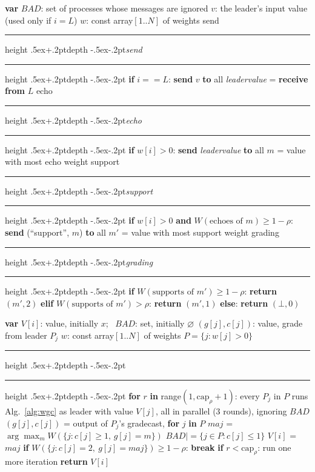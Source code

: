 \documentclass[conference]{IEEEtran}
\theoremstyle{definition}
\newcommand{\W}{W}
\newcommand{\capr}{\mathrm{cap}_\rho}
\newcommand{\BAD}{\mathit{BAD}}
\newcommand{\maj}{\mathit{maj}}
\newcommand{\kw}[1]{\textbf{#1}}
\newcommand{\varind}{\hphantom{\kw{var}}}
\newcommand{\midrulefill}{\leavevmode\leaders\hrule height \dimexpr.5ex+.2pt\relax depth -\dimexpr.5ex-.2pt\relax\hfill\kern0pt}
\newcommand{\sep}[1]{\ifx\relax#1\relax\hrulefill\else\midrulefill\enspace\textit{#1}\enspace\midrulefill\fi}
\newcommand{\ind}{\hspace*{\algorithmicindent}}
\begin{document}
\begin{algorithm}[t]
\caption{Weighted Gradecast at $P_i$, leader $L$, for $\rho<1/3$}\label{alg:wgc}
\begin{algorithmic}[1]
\Statex \kw{var} $\BAD$: set of processes whose messages are ignored
\Statex \varind $v$: the leader's input value (used only if $i=L$)
\Statex \varind $w$: const array$[1..N]$ of weights
\Statex \sep{send}
\State \kw{if} $i==L$: \kw{send} $v$ \kw{to} all
\State \textit{leadervalue} = \kw{receive from} $L$
\Statex \sep{echo}
\State \kw{if} $w[i]>0$: \kw{send} \textit{leadervalue} \kw{to} all
\State $m$ = value with most echo weight
\Statex \sep{support}
\State \kw{if} $w[i]>0$ \kw{and} $\W(\text{echoes of }m)\ge 1-\rho$:
\Statex \ind\ind \kw{send} (``support'', $m$) \kw{to} all
\State $m'$ = value with most support weight
\Statex \sep{grading}
\State \kw{if} $\W(\text{supports of }m')\ge 1-\rho$: \kw{return} $(m',2)$
\State \kw{elif} $\W(\text{supports of }m')>\rho$: \kw{return} $(m',1)$
\State \kw{else}: \kw{return} $(\bot,0)$
\end{algorithmic}
\end{algorithm}

\begin{algorithm}[t]
\caption{Weighted Gradecast consensus at $P_i$, for $\rho<1/3$}\label{alg:cons}
\begin{algorithmic}[1]
\Statex \kw{var} $V[i]$: value, initially $x$; \ $\BAD$: set, initially $\varnothing$
\Statex \varind $(g[j],c[j])$: value, grade from leader $P_j$
\Statex \varind $w$: const array$[1..N]$ of weights
\Statex \varind $P=\{j : w[j]>0\}$\vspace{-0.5\baselineskip}
\Statex \sep{}
\State \kw{for} $r$ \kw{in} range$(1,\capr+1)$:
\State \ind every $P_j$ in $P$ runs Alg.~\ref{alg:wgc} as leader with value
\Statex \ind\ind $V[j]$, all in parallel (3 rounds), ignoring $\BAD$
\State \ind $(g[j],c[j])$ = output of $P_j$'s gradecast, \kw{for} $j$ \kw{in} $P$
\State \ind $\maj$ = $\arg\max_m \W(\{j : c[j]\ge1,\, g[j]=m\})$
\State \ind $\BAD \mathrel{|{=}} \{j\in P : c[j]\le 1\}$
\State \ind $V[i]$ = $\maj$
\State \ind \kw{if} $\W(\{j : c[j]=2,\ g[j]=\maj\})\ge 1-\rho$:
\State \ind\ind \kw{break}
\State \kw{if} $r<\capr$: run one more iteration
\State \kw{return} $V[i]$
\end{algorithmic}
\end{algorithm}
\end{document}
